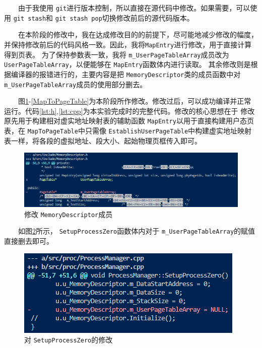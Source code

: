　　由于我使用 \texttt{git}进行版本控制，所以直接在源代码中修改。如果需要，可以使用 \texttt{git stash}和 \texttt{git stash pop}切换修改前后的源代码版本。

　　在本阶段的修改中，我在达成修改目的的前提下，尽可能地减少修改的幅度，并保持修改前后的代码风格一致。因此，我将\texttt{MapEntry}进行修改，用于直接计算得到页表。
为了保持参数表一致，我将 \texttt{m\_UserPageTableArray}成员改为 \texttt{UserPageTableArray}，以便能够在 \texttt{MapEntry}函数体内进行读取。
其余修改则是根据编译器的报错进行的，主要内容是把 \texttt{MemoryDescriptor}类的成员函数中对\texttt{m\_UserPageTableArray}成员的使用部分删去。

　　图\ref{member}-\ref{MapToPageTable}为本阶段所作修改。修改过后，可以成功编译并正常运行。代码\ref{lst:h},\ref{lst:cpp}为本实验完成时的完整代码。修改的核心思想在于
修改原先用于构建相对虚实地址映射表的辅助函数 \texttt{MapEntry}以用于直接构建用户态页表，在 \texttt{MapToPageTable}中只需像 \texttt{EstablishUserPageTable}中构建虚实地址映射表一样，将各段的虚拟地址、段大小、起始物理页框传入即可。

\begin{figure}[!htbp]
    \centering
    \includegraphics[width=\textwidth]{images/member.png}
    \caption{修改 \texttt{MemoryDescriptor}成员}\label{member}
\end{figure}

　　如图\ref{SetupProcessZero}所示， \texttt{SetupProcessZero}函数体内对于 \texttt{m\_UserPageTableArray}的赋值直接删去即可。

\begin{figure}[!htbp]
    \centering
    \includegraphics[scale=1]{images/SetupProcessZero.png}
    \caption{对 \texttt{SetupProcessZero}的修改}\label{SetupProcessZero}
\end{figure}


